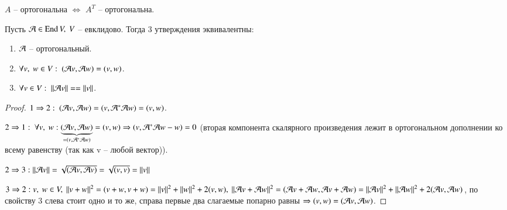 \documentclass[main]{subfiles}
\begin{document}
\begin{remark}
    $A$ -- ортогональна $\Leftrightarrow$ $A^T$ -- ортогональна.
\end{remark}

\begin{proposition}
    Пусть $\mathcal{A} \in \operatorname{End} V, \ V$ -- евклидово. Тогда 3 утверждения эквивалентны:
    \begin{enumerate}
        \item $\mathcal{A}$ -- ортогональный.
        \item $\forall v, \ w \in V: \ (\mathcal{A} v, \mathcal{A} w) = (v, w)$.
        \item $\forall v \in V: \ ||\mathcal{A} v|| == ||v||$.
    \end{enumerate}
\end{proposition}

\begin{proof}
    $1 \Rightarrow 2: \ (\mathcal{A} v, \mathcal{A} w) = (v, \mathcal{A}^* \mathcal{A} w) = (v, w)$.

    $2 \Rightarrow 1: \ \forall v, \ w: \underbrace{(\mathcal{A} v, \mathcal{A} w)}_{= (v, \mathcal{A}^* \mathcal{A} w)} = (v, w) \Rightarrow (v, \mathcal{A}^* \mathcal{A} w - w) = 0$ (вторая компонента скалярного произведения лежит в ортогональном дополнении ко всему равенству (так как v -- любой вектор)).

    $2 \Rightarrow 3: ||\mathcal{A} v|| = \sqrt{(\mathcal{A} v, \mathcal{A} v)} = \sqrt{(v, v)} = ||v||$

    $3 \Rightarrow 2: v, \ w \in V, \ ||v + w||^2 = (v+w, v+w) = ||v||^2 + ||w||^2 + 2(v, w), \
        ||\mathcal{A} v + \mathcal{A} w||^2 = (\mathcal{A} v + \mathcal{A} w, \mathcal{A} v + \mathcal{A} w) = ||\mathcal{A} v||^2 + ||\mathcal{A} w||^2 + 2(\mathcal{A} v, \mathcal{A} w)$,
    по свойству 3 слева стоит одно и то же, справа первые два слагаемые попарно равны $\Rightarrow (v, w) = (\mathcal{A} v, \mathcal{A} w)$.
\end{proof}
\end{document}
